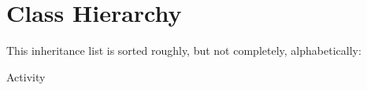 \section{Class Hierarchy}
This inheritance list is sorted roughly, but not completely, alphabetically\-:\begin{DoxyCompactList}
\item Activity\begin{DoxyCompactList}
\item {}
\end{DoxyCompactList}
\end{DoxyCompactList}
